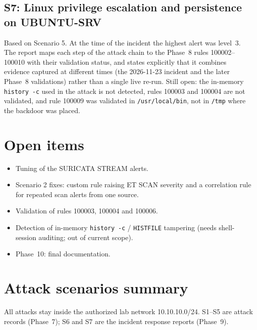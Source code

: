\documentclass[11pt,a4paper]{article}
\begin{document}
\subsection{S7: Linux privilege escalation and persistence on UBUNTU-SRV}

Based on Scenario 5. At the time of the incident the highest alert was
level~3. The report maps each step of the attack chain to the Phase~8 rules
100002--100010 with their validation status, and states explicitly that it
combines evidence captured at different times (the 2026-11-23 incident and the
later Phase~8 validations) rather than a single live re-run. Still open: the
in-memory \texttt{history -c} used in the attack is not detected, rules 100003
and 100004 are not validated, and rule 100009 was validated in
\texttt{/usr/local/bin}, not in \texttt{/tmp} where the backdoor was placed.

\section{Open items}

\begin{itemize}
  \item Tuning of the SURICATA STREAM alerts.
  \item Scenario 2 fixes: custom rule raising ET SCAN severity and a
        correlation rule for repeated scan alerts from one source.
  \item Validation of rules 100003, 100004 and 100006.
  \item Detection of in-memory \texttt{history -c} / \texttt{HISTFILE}
        tampering (needs shell-session auditing; out of current scope).
  \item Phase~10: final documentation.
\end{itemize}

\section{Attack scenarios summary}

All attacks stay inside the authorized lab network 10.10.10.0/24. S1--S5 are
attack records (Phase~7); S6 and S7 are the incident response reports
(Phase~9).
\end{document}
